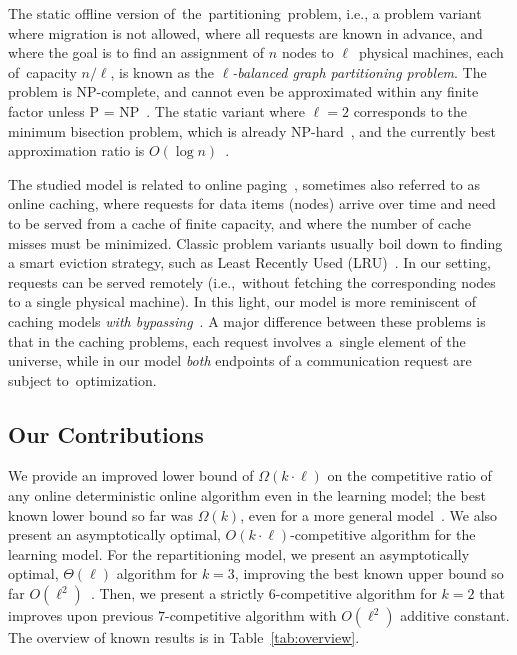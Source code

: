 \documentclass[manuscript,screen=true, review, anonymous]{acmart}
\begin{document}
The static offline version of~the~partitioning~problem, i.e., a problem variant where
migration is not allowed, where all requests are known in advance, and where
the goal is to find an assignment of $n$ nodes to $\ell$~physical machines, each of~capacity $n/\ell$, is known as the
\emph{$\ell$-balanced graph partitioning problem}. The problem is 
NP-complete, and cannot even be approximated within any finite factor unless P
= NP~\cite{AndRae06}.  The static
variant where $\ell = 2$ corresponds to the minimum bisection problem, which
is already NP-hard~\cite{GaJoSt76}, and 
the currently best approximation ratio is $O(\log n)$~\cite{SarVaz95,ArKaKa99,FeKrNi00,FeiKra02,KraFei06,Raec08}.

The studied model is related to online
paging~\cite{SleTar85,FKLMSY91,McGSle91,AcChNo00}, sometimes also referred to
as online caching, where requests for data items (nodes) arrive over time and
need to be served from a cache of finite capacity, and where the number of
cache misses must be minimized. Classic problem variants usually boil down to
finding a smart eviction strategy, such as Least Recently Used (LRU)~\cite{SleTar85}. In our
setting, requests can be served remotely (i.e.,~without fetching the
corresponding nodes to a single physical machine). In this light, our model is more
reminiscent of caching models \emph{with
bypassing}~\cite{EpImLN11,EpImLN15,Irani02}.
A major difference between  these problems is that in the caching problems, each request involves a~single element of the universe, while in our model \emph{both} endpoints of a communication request are subject to~optimization.


\subsection{Our Contributions}
We provide an improved lower bound 
of $\Omega(k\cdot\ell)$ on the competitive ratio of any online deterministic online algorithm 
even in the learning model;
the best known lower bound so far was $\Omega(k)$,
even for a more general model~\cite{repartition-disc}.
We also present an asymptotically optimal, 
$O(k\cdot \ell)$-competitive algorithm
for the learning model.
For the repartitioning model, we present  
an asymptotically optimal,
$\Theta(\ell)$ algorithm for $k=3$, improving the best known upper bound 
so far $O(\ell^2)$~\cite{repartition-disc}.
Then, we present a strictly $6$-competitive algorithm for $k=2$ that improves upon previous $7$-competitive algorithm with $O(\ell^2)$ additive constant.
%
The overview of known results is in Table~\ref{tab:overview}.
\end{document}
